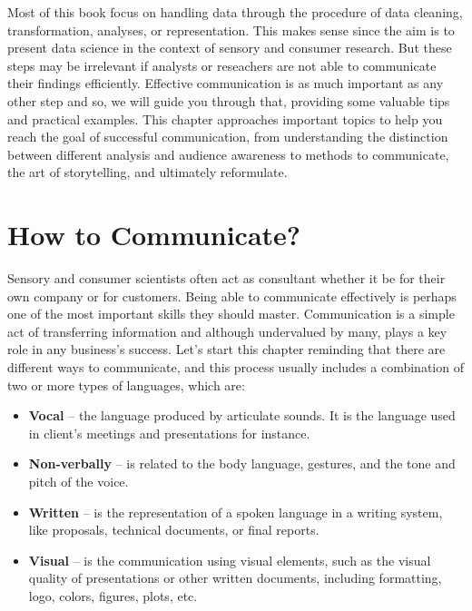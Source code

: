 \documentclass[
]{krantz}
\providecommand{\tightlist}{%
  \setlength{\itemsep}{0pt}\setlength{\parskip}{0pt}}
\renewenvironment{quote}{\begin{VF}}{\end{VF}}
\begin{document}
\begin{quote}
Most of this book focus on handling data through the procedure of data cleaning, transformation, analyses, or representation. This makes sense since the aim is to present data science in the context of sensory and consumer research. But these steps may be irrelevant if analysts or reseachers are not able to communicate their findings efficiently. Effective communication is as much important as any other step and so, we will guide you through that, providing some valuable tips and practical examples. This chapter approaches important topics to help you reach the goal of successful communication, from understanding the distinction between different analysis and audience awareness to methods to communicate, the art of storytelling, and ultimately reformulate.
\end{quote}

\hypertarget{how-to-communicate}{%
\section{How to Communicate?}\label{how-to-communicate}}

Sensory and consumer scientists often act as consultant whether it be for their own company or for customers. Being able to communicate effectively is perhaps one of the most important skills they should master. Communication is a simple act of transferring information and although undervalued by many, plays a key role in any business's success. Let's start this chapter reminding that there are different ways to communicate, and this process usually includes a combination of two or more types of languages, which are:

\begin{itemize}
\tightlist
\item
  \textbf{Vocal} -- the language produced by articulate sounds. It is the language used in client's meetings and presentations for instance.
\item
  \textbf{Non-verbally} -- is related to the body language, gestures, and the tone and pitch of the voice.
\item
  \textbf{Written} -- is the representation of a spoken language in a writing system, like proposals, technical documents, or final reports.
\item
  \textbf{Visual} -- is the communication using visual elements, such as the visual quality of presentations or other written documents, including formatting, logo, colors, figures, plots, etc.
\end{itemize}
\end{document}
